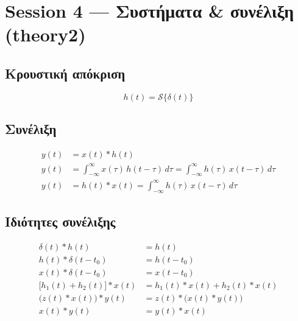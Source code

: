 \documentclass[11pt,a4paper]{article}
\begin{document}
\section{Session 4 — Συστήματα \& συνέλιξη (theory2)}

\subsection{Κρουστική απόκριση}
\begin{equation}
h(t) = \mathcal{S}\{\delta(t)\}
\end{equation}

\subsection{Συνέλιξη}
\begin{align}
y(t) &= x(t) \ast h(t) \\
y(t) &= \int_{-\infty}^{\infty} x(\tau)\,h(t-\tau)\,d\tau
     = \int_{-\infty}^{\infty} h(\tau)\,x(t-\tau)\,d\tau \\
y(t) &= h(t) \ast x(t) = \int_{-\infty}^{\infty} h(\tau)\,x(t-\tau)\,d\tau
\end{align}

\subsection{Ιδιότητες συνέλιξης}
\begin{align}
\delta(t) \ast h(t) &= h(t) \\
h(t) \ast \delta(t-t_0) &= h(t-t_0) \\
x(t) \ast \delta(t-t_0) &= x(t-t_0) \\
\bigl[h_1(t)+h_2(t)\bigr] \ast x(t) &= h_1(t)\ast x(t) + h_2(t)\ast x(t) \\
\bigl(z(t)\ast x(t)\bigr)\ast y(t) &= z(t)\ast\bigl(x(t)\ast y(t)\bigr) \\
x(t)\ast y(t) &= y(t)\ast x(t)
\end{align}
\end{document}
